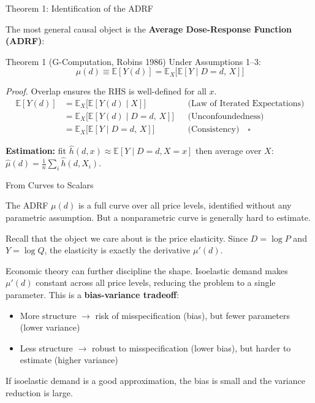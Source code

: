 \documentclass[aspectratio=169, 11pt]{beamer}
\newcommand{\E}{\mathbb{E}}
\begin{document}
\begin{frame}{Theorem 1: Identification of the ADRF}

The most general causal object is the \textbf{Average Dose-Response Function (ADRF)}:

\begin{block}{Theorem 1 (G-Computation, Robins 1986)}
Under Assumptions 1--3:
\[
\mu(d) \equiv \E[Y(d)] = \E_X\!\bigl[\E[Y \mid D=d,\, X]\bigr]
\]
\end{block}

\pause

\textit{Proof.} Overlap ensures the RHS is well-defined for all $x$. 
\begin{align*}
\E[Y(d)]
&= \E_X\!\bigl[\E[Y(d) \mid X]\bigr]
    && \text{(Law of Iterated Expectations)} \\[4pt]
&= \E_X\!\bigl[\E[Y(d) \mid D=d,\, X]\bigr]
    && \text{(Unconfoundedness)} \\[4pt]
&= \E_X\!\bigl[\E[Y \mid D=d,\, X]\bigr]
    && \text{(Consistency)} \quad\square
\end{align*}

\pause

\textbf{Estimation:} fit $\hat{h}(d, x) \approx \E[Y \mid D=d, X=x]$ then average over $X$:
$\hat{\mu}(d) = \frac{1}{n}\sum_i \hat{h}(d, X_i)$.

\end{frame}



\begin{frame}{From Curves to Scalars}

The ADRF $\mu(d)$ is a full curve over all price levels, identified without any parametric assumption. But a nonparametric curve is generally hard to estimate.

\bigskip
\pause

Recall that the object we care about is the price elasticity. Since $D = \log P$ and $Y = \log Q$, the elasticity is exactly the derivative $\mu'(d)$.

\bigskip
\pause

Economic theory can further discipline the shape. Isoelastic demand makes $\mu'(d)$ constant across all price levels, reducing the problem to a single parameter. This is a \textbf{bias-variance tradeoff}:
\begin{itemize}
    \item More structure $\to$ risk of misspecification (bias), but fewer parameters (lower variance)
    \item Less structure $\to$ robust to misspecification (lower bias), but harder to estimate (higher variance)
\end{itemize}

\bigskip
\pause

If isoelastic demand is a good approximation, the bias is small and the variance reduction is large.

\end{frame}
\end{document}
